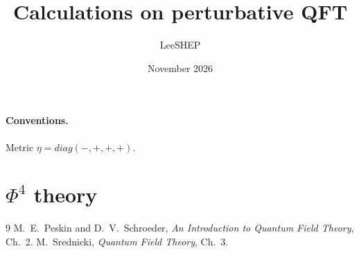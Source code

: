 \documentclass[11pt]{article}
\title{Calculations on perturbative QFT}
\author{LeeSHEP}
\date{November 2026}
\begin{document}
\maketitle

\paragraph{Conventions.} Metric $\eta = diag(-,+,+,+)$. 

\section{$\Phi^4$ theory}



\begin{thebibliography}{9}
   M.~E.~Peskin and D.~V.~Schroeder, \emph{An Introduction to Quantum Field Theory}, Ch.~2.
   M.~Srednicki, \emph{Quantum Field Theory}, Ch.~3.
\end{thebibliography}
\end{document}

